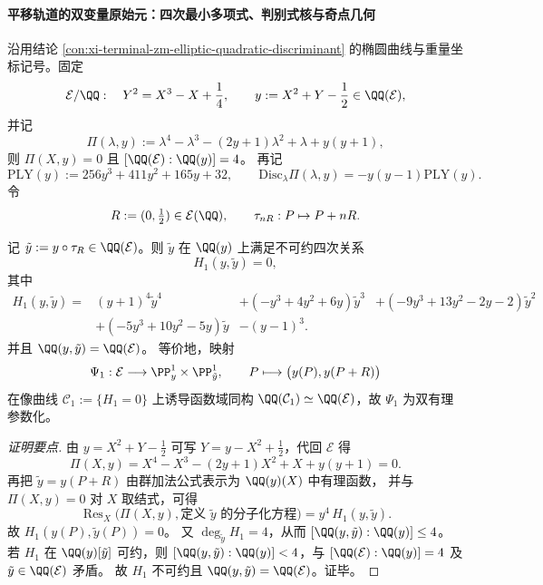 \paragraph{平移轨道的双变量原始元：四次最小多项式、判别式核与奇点几何}
沿用结论 \ref{con:xi-terminal-zm-elliptic-quadratic-discriminant} 的椭圆曲线与重量坐标记号。固定
\[
\mathcal E/\QQ:\quad Y^{2}=X^{3}-X+\frac14,
\qquad
y:=X^{2}+Y-\frac12\in \QQ(\mathcal E),
\]
并记
\[
\Pi(\lambda,y):=\lambda^{4}-\lambda^{3}-(2y+1)\lambda^{2}+\lambda+y(y+1),
\]
则 \(\Pi(X,y)=0\) 且 \([\QQ(\mathcal E):\QQ(y)]=4\)。
再记
\[
\mathrm{PLY}(y):=256y^{3}+411y^{2}+165y+32,
\qquad
\mathrm{Disc}_{\lambda}\Pi(\lambda,y)=-y(y-1)\mathrm{PLY}(y).
\]
令
\[
R:=(0,\tfrac12)\in \mathcal E(\QQ),
\qquad
\tau_{nR}:P\mapsto P+nR.
\]

\begin{conclusion}\label{con:xi-terminal-zm-translation-r-primitive-minpoly}
记 \(\tilde y:=y\circ\tau_{R}\in \QQ(\mathcal E)\)。则 \(\tilde y\) 在 \(\QQ(y)\) 上满足不可约四次关系
\[
H_{1}(y,\tilde y)=0,
\]
其中
\[
\boxed{
\begin{aligned}
H_{1}(y,\tilde y)
={}&(y+1)^{4}\tilde y^{4}
&+(-y^{3}+4y^{2}+6y)\tilde y^{3}
&+(-9y^{3}+13y^{2}-2y-2)\tilde y^{2}\\
&+(-5y^{3}+10y^{2}-5y)\tilde y
&-(y-1)^{3}.
\end{aligned}
}
\]
并且 \(\QQ(y,\tilde y)=\QQ(\mathcal E)\)。
等价地，映射
\[
\Psi_{1}:\mathcal E\longrightarrow \PP^{1}_{y}\times \PP^{1}_{\tilde y},
\qquad
P\longmapsto \bigl(y(P),y(P+R)\bigr)
\]
在像曲线 \(\mathcal C_{1}:=\{H_{1}=0\}\) 上诱导函数域同构 \(\QQ(\mathcal C_{1})\simeq \QQ(\mathcal E)\)，故 \(\Psi_{1}\) 为双有理参数化。
\end{conclusion}
\begin{proof}[证明要点]
由 \(y=X^{2}+Y-\tfrac12\) 可写 \(Y=y-X^{2}+\tfrac12\)，代回 \(\mathcal E\) 得
\[
\Pi(X,y)=X^{4}-X^{3}-(2y+1)X^{2}+X+y(y+1)=0.
\]
再把 \(\tilde y=y(P+R)\) 由群加法公式表示为 \(\QQ(y)(X)\) 中有理函数，
并与 \(\Pi(X,y)=0\) 对 \(X\) 取结式，可得
\[
\operatorname{Res}_{X}\!\bigl(\Pi(X,y),\text{定义 }\tilde y\text{ 的分子化方程}\bigr)
=y^{4}\,H_{1}(y,\tilde y).
\]
故 \(H_{1}(y(P),\tilde y(P))=0\)。
又 \(\deg_{\tilde y}H_{1}=4\)，从而 \([\QQ(y,\tilde y):\QQ(y)]\le 4\)。
若 \(H_{1}\) 在 \(\QQ(y)[\tilde y]\) 可约，则 \([\QQ(y,\tilde y):\QQ(y)]<4\)，与 \([\QQ(\mathcal E):\QQ(y)]=4\) 及 \(\tilde y\in\QQ(\mathcal E)\) 矛盾。
故 \(H_{1}\) 不可约且 \(\QQ(y,\tilde y)=\QQ(\mathcal E)\)。证毕。
\end{proof}

